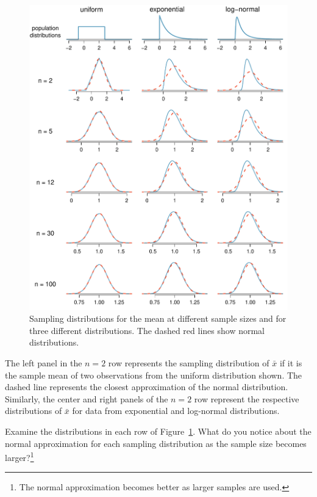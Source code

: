 \begin{figure}[H]
   \centering
   \includegraphics[width=\textwidth]{03-5/figures/cltSimulations/cltSimulationsNewest2.pdf}
   \caption{Sampling distributions for the mean at different sample sizes and for three different distributions. The dashed red lines show normal distributions.}
   \label{cltSimulations}
\end{figure}

The left panel in the $n=2$ row represents the sampling distribution of $\bar{x}$ if it is the sample mean of two observations from the uniform distribution shown. The dashed line represents the closest approximation of the normal distribution. Similarly, the center and right panels of the $n=2$ row represent the respective distributions of $\bar{x}$ for data from exponential and log-normal distributions.

\begin{exercise}
Examine the distributions in each row of Figure~\ref{cltSimulations}. What do you notice about the normal approximation for each sampling distribution as the sample size becomes larger?\footnote{The normal approximation becomes better as larger samples are used.}
\end{exercise}

